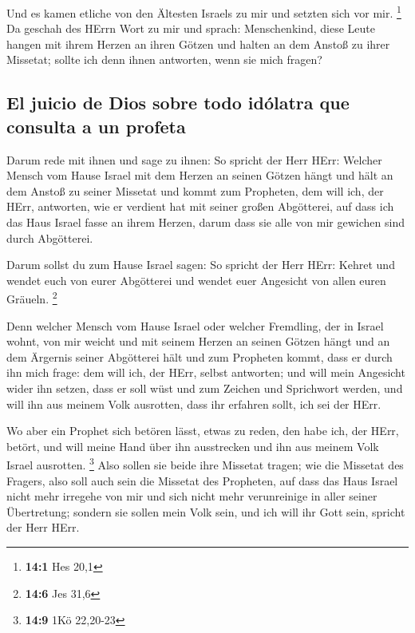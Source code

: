  Und es kamen etliche von den Ältesten Israels zu mir und
setzten sich vor mir. \footnote{\textbf{14:1} Hes 20,1} 
Da geschah des HErrn Wort zu mir und sprach: 
Menschenkind, diese Leute hangen mit ihrem Herzen an ihren Götzen und
halten an dem Anstoß zu ihrer Missetat; sollte ich denn ihnen antworten,
wenn sie mich fragen?

\hypertarget{el-juicio-de-dios-sobre-todo-iduxf3latra-que-consulta-a-un-profeta}{%
\subsection{El juicio de Dios sobre todo idólatra que consulta a un
profeta}\label{el-juicio-de-dios-sobre-todo-iduxf3latra-que-consulta-a-un-profeta}}

 Darum rede mit ihnen und sage zu ihnen: So spricht der
Herr HErr: Welcher Mensch vom Hause Israel mit dem Herzen an seinen
Götzen hängt und hält an dem Anstoß zu seiner Missetat und kommt zum
Propheten, dem will ich, der HErr, antworten, wie er verdient hat mit
seiner großen Abgötterei,  auf dass ich das Haus Israel
fasse an ihrem Herzen, darum dass sie alle von mir gewichen sind durch
Abgötterei.

 Darum sollst du zum Hause Israel sagen: So spricht der
Herr HErr: Kehret und wendet euch von eurer Abgötterei und wendet euer
Angesicht von allen euren Gräueln. \footnote{\textbf{14:6} Jes 31,6}

 Denn welcher Mensch vom Hause Israel oder welcher
Fremdling, der in Israel wohnt, von mir weicht und mit seinem Herzen an
seinen Götzen hängt und an dem Ärgernis seiner Abgötterei hält und zum
Propheten kommt, dass er durch ihn mich frage: dem will ich, der HErr,
selbst antworten;  und will mein Angesicht wider ihn
setzen, dass er soll wüst und zum Zeichen und Sprichwort werden, und
will ihn aus meinem Volk ausrotten, dass ihr erfahren sollt, ich sei der
HErr.

 Wo aber ein Prophet sich betören lässt, etwas zu reden,
den habe ich, der HErr, betört, und will meine Hand über ihn ausstrecken
und ihn aus meinem Volk Israel ausrotten. \footnote{\textbf{14:9} 1Kö
  22,20-23}  Also sollen sie beide ihre Missetat tragen;
wie die Missetat des Fragers, also soll auch sein die Missetat des
Propheten,  auf dass das Haus Israel nicht mehr irregehe
von mir und sich nicht mehr verunreinige in aller seiner Übertretung;
sondern sie sollen mein Volk sein, und ich will ihr Gott sein, spricht
der Herr HErr.

